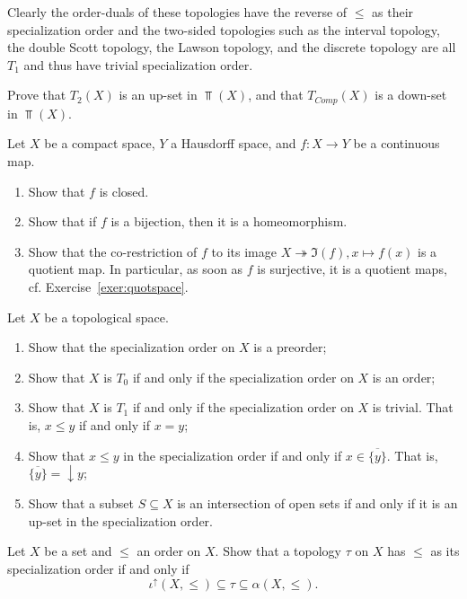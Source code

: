 Clearly the order-duals of these topologies have the reverse of $\leq$ as their specialization order and the two-sided topologies such as the interval topology, the double Scott topology, the Lawson topology, and the discrete topology are all $T_1$ and thus have trivial specialization order.

\exercises
\begin{exercise}
  \label{ex:down-and-up-in-Top}
  Prove that $T_2(X)$ is an up-set in $\Top(X)$, and that $T_{Comp}(X)$ is a down-set in $\Top(X)$.
\end{exercise}
\begin{exercise}\label{exer:closedmap}
Let $X$ be a compact space, $Y$ a Hausdorff space, and $f\colon X\to Y$ be a continuous map.
\begin{enumerate}
\item Show that $f$ is closed. 
\item Show that if $f$ is a bijection, then it is a homeomorphism.
\item Show that  the  co-restriction of $f$ to its image $X\twoheadrightarrow\Im(f), x\mapsto f(x)$ is  a quotient map. In particular, as soon as $f$ is surjective, it is a quotient maps, cf. Exercise~\ref{exer:quotspace}.
\end{enumerate}
\end{exercise}

\begin{exercise}\label{exer:specorder}
Let $X$ be a topological space.
\begin{enumerate}
\item Show that the specialization order on $X$ is a preorder;
\item Show that $X$ is $T_0$ if and only if the specialization order on $X$ is an order;
\item Show that $X$ is $T_1$ if and only if the specialization order on $X$ is trivial. That is, $x\leq y$ if and only if $x=y$;
\item Show that $x\leq y$ in the specialization order if and only if $x\in\overline{\{y\}}$. That is, $\overline{\{y\}}={\downarrow}y$;
\item Show that a subset $S\subseteq X$ is an intersection of open sets if and only if it is an up-set in the specialization order.
\end{enumerate}
\end{exercise}

\begin{exercise}\label{exer:interval-ordertop}
Let $X$ be a set and $\leq$ an order on $X$. Show that a topology $\tau$ on $X$ has $\leq$ as its specialization order if and only if
\[
\iota^\uparrow(X,\leq)\subseteq\tau\subseteq\alpha(X,\leq).
\]
\end{exercise}

